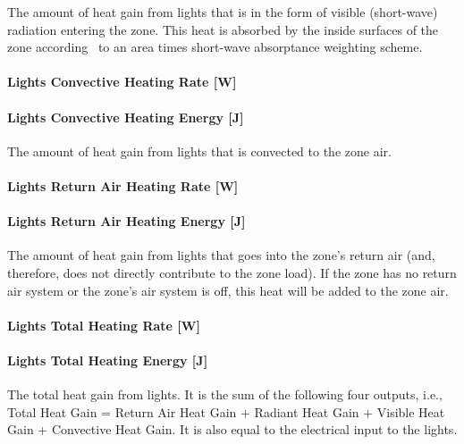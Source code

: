 The amount of heat gain from lights that is in the form of visible (short-wave) radiation entering the zone. This heat is absorbed by the inside surfaces of the zone according~ to an area times short-wave absorptance weighting scheme.

\paragraph{Lights Convective Heating Rate {[}W{]}}\label{lights-convective-heating-rate-w}

\paragraph{Lights Convective Heating Energy {[}J{]}}\label{lights-convective-heating-energy-j}

The amount of heat gain from lights that is convected to the zone air.

\paragraph{Lights Return Air Heating Rate {[}W{]}}\label{lights-return-air-heating-rate-w}

\paragraph{Lights Return Air Heating Energy {[}J{]}}\label{lights-return-air-heating-energy-j}

The amount of heat gain from lights that goes into the zone's return air (and, therefore, does not directly contribute to the zone load). If the zone has no return air system or the zone's air system is off, this heat will be added to the zone air.

\paragraph{Lights Total Heating Rate {[}W{]}}\label{lights-total-heating-rate-w}

\paragraph{Lights Total Heating Energy {[}J{]}}\label{lights-total-heating-energy-j}

The total heat gain from lights. It is the sum of the following four outputs, i.e., Total Heat Gain = Return Air Heat Gain + Radiant Heat Gain + Visible Heat Gain + Convective Heat Gain. It is also equal to the electrical input to the lights.

